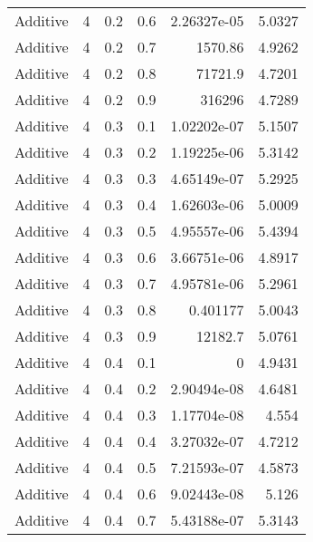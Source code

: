 \documentclass{article}
\begin{document}
\begin{longtable}[H]{lrrrrr}
 Additive       &       4 &   0.2 &            0.6 &      2.26327e-05 &          5.0327 \\
 Additive       &       4 &   0.2 &            0.7 &   1570.86        &          4.9262 \\
 Additive       &       4 &   0.2 &            0.8 &  71721.9         &          4.7201 \\
 Additive       &       4 &   0.2 &            0.9 & 316296           &          4.7289 \\
 Additive       &       4 &   0.3 &            0.1 &      1.02202e-07 &          5.1507 \\
 Additive       &       4 &   0.3 &            0.2 &      1.19225e-06 &          5.3142 \\
 Additive       &       4 &   0.3 &            0.3 &      4.65149e-07 &          5.2925 \\
 Additive       &       4 &   0.3 &            0.4 &      1.62603e-06 &          5.0009 \\
 Additive       &       4 &   0.3 &            0.5 &      4.95557e-06 &          5.4394 \\
 Additive       &       4 &   0.3 &            0.6 &      3.66751e-06 &          4.8917 \\
 Additive       &       4 &   0.3 &            0.7 &      4.95781e-06 &          5.2961 \\
 Additive       &       4 &   0.3 &            0.8 &      0.401177    &          5.0043 \\
 Additive       &       4 &   0.3 &            0.9 &  12182.7         &          5.0761 \\
 Additive       &       4 &   0.4 &            0.1 &      0           &          4.9431 \\
 Additive       &       4 &   0.4 &            0.2 &      2.90494e-08 &          4.6481 \\
 Additive       &       4 &   0.4 &            0.3 &      1.17704e-08 &          4.554  \\
 Additive       &       4 &   0.4 &            0.4 &      3.27032e-07 &          4.7212 \\
 Additive       &       4 &   0.4 &            0.5 &      7.21593e-07 &          4.5873 \\
 Additive       &       4 &   0.4 &            0.6 &      9.02443e-08 &          5.126  \\
 Additive       &       4 &   0.4 &            0.7 &      5.43188e-07 &          5.3143 \\

\end{longtable}
\end{document}
